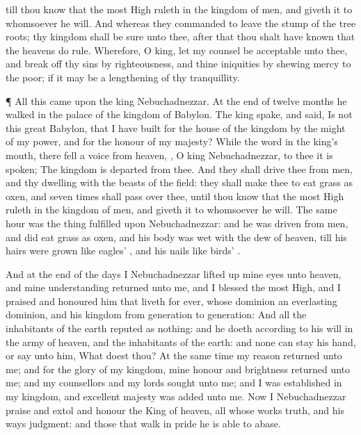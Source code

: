 {till thou
know that the most
High
ruleth in the
kingdom of
men, and
giveth it to
whomsoever he
will.
And whereas they
commanded to
leave the
stump of the
tree
roots; thy
kingdom shall be
sure unto thee,
after that thou shalt have
known that the
heavens do
rule.
Wherefore, O
king, let my
counsel be
acceptable unto
thee, and break
off thy
sins by
righteousness, and thine
iniquities by shewing
mercy to the
poor;
if it may
be a
lengthening of thy
tranquillity.
\par }{\PP {}¶
All this
came
upon the
king
Nebuchadnezzar.
At the
end of
twelve
months he
walked
in the
palace of the
kingdom of
Babylon.
The
king
spake, and
said, Is
not
this
great
Babylon, that
I have
built for the
house of the
kingdom by the
might of my
power, and for the
honour of my
majesty?
While the
word
{} in the
king’s
mouth, there
fell a
voice
from
heaven,
{}, O
king
Nebuchadnezzar, to thee it is
spoken; The
kingdom is
departed
from thee.
And they shall
drive thee
from
men, and thy
dwelling
{}
with the
beasts of the
field: they shall make thee to
eat
grass as
oxen, and
seven
times shall
pass
over thee,
until thou
know that the most
High
ruleth in the
kingdom of
men, and
giveth it to
whomsoever he
will.
The same
hour was the
thing
fulfilled
upon
Nebuchadnezzar: and he was
driven
from
men, and did
eat
grass as
oxen, and his
body was
wet with the
dew of
heaven,
till his
hairs were
grown like
eagles’
{}, and his
nails like
birds’
{}.
\par }{\PP {}And at the
end of the
days
I
Nebuchadnezzar lifted
up mine
eyes unto
heaven, and mine
understanding
returned unto
me, and I
blessed the most
High, and I
praised and
honoured him that
liveth for
ever, whose
dominion
{} an
everlasting
dominion, and his
kingdom
{}
from
generation to
generation:
And
all the
inhabitants of the
earth
{}
reputed as
nothing: and he
doeth according to his
will in the
army of
heaven, and
{} the
inhabitants of the
earth: and
none
can
stay his
hand, or
say unto him,
What
doest thou?
At the same
time my
reason
returned unto
me; and for the
glory of my
kingdom, mine
honour and
brightness
returned unto
me; and my
counsellors and my
lords
sought unto
me; and I was
established in my
kingdom, and
excellent
majesty was
added unto me.
Now
I
Nebuchadnezzar
praise and
extol and
honour the
King of
heaven,
all whose
works
{}
truth, and his
ways
judgment: and those that
walk in
pride he is
able to
abase.

}
